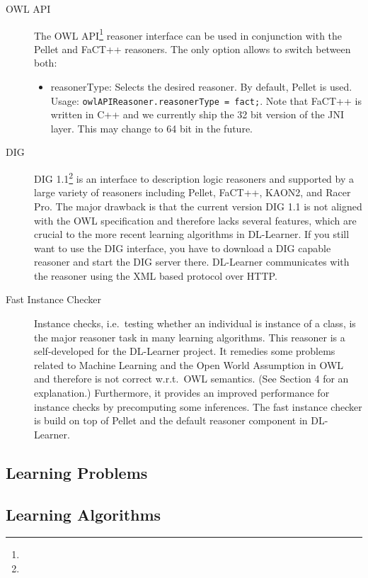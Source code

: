 \documentclass[a4paper,12pt]{scrartcl}
\begin{document}
\begin{description}
 \item[OWL API] The OWL API\footnote{\owlapi} reasoner interface can be used in conjunction with the Pellet and FaCT++ reasoners. The only option allows to switch between both:
 \begin{itemize}
  \item reasonerType: Selects the desired reasoner. By default, Pellet is used. Usage: \verb|owlAPIReasoner.reasonerType = fact;|. Note that FaCT++ is written in C++ and we currently ship the 32 bit version of the JNI layer. This may change to 64 bit in the future.
 \end{itemize}
 \item[DIG] DIG 1.1\footnote{\dig} is an interface to description logic reasoners and supported by a large variety of reasoners including Pellet, FaCT++, KAON2, and Racer Pro. The major drawback is that the current version DIG 1.1 is not aligned with the OWL specification and therefore lacks several features, which are crucial to the more recent learning algorithms in DL-Learner. If you still want to use the DIG interface, you have to download a DIG capable reasoner and start the DIG server there. DL-Learner communicates with the reasoner using the XML based protocol over HTTP.
 \item[Fast Instance Checker] Instance checks, i.e.~testing whether an individual is instance of a class, is the major reasoner task in many learning algorithms. This reasoner is a self-developed for the DL-Learner project. It remedies some problems related to Machine Learning and the Open World Assumption in OWL and therefore is not correct w.r.t.~OWL semantics. (See \cite{cheng00} Section 4 for an explanation.) Furthermore, it provides an improved performance for instance checks by precomputing some inferences. The fast instance checker is build on top of Pellet and the default reasoner component in DL-Learner.
\end{description}

\subsection{Learning Problems}

\begin{description}
 \item 
\end{description}


\subsection{Learning Algorithms}
\end{document}
